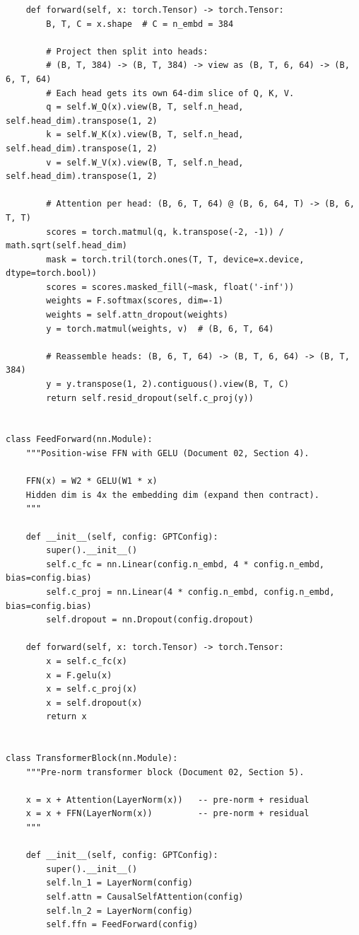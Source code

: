\begin{lstlisting}
    def forward(self, x: torch.Tensor) -> torch.Tensor:
        B, T, C = x.shape  # C = n_embd = 384

        # Project then split into heads:
        # (B, T, 384) -> (B, T, 384) -> view as (B, T, 6, 64) -> (B, 6, T, 64)
        # Each head gets its own 64-dim slice of Q, K, V.
        q = self.W_Q(x).view(B, T, self.n_head, self.head_dim).transpose(1, 2)
        k = self.W_K(x).view(B, T, self.n_head, self.head_dim).transpose(1, 2)
        v = self.W_V(x).view(B, T, self.n_head, self.head_dim).transpose(1, 2)

        # Attention per head: (B, 6, T, 64) @ (B, 6, 64, T) -> (B, 6, T, T)
        scores = torch.matmul(q, k.transpose(-2, -1)) / math.sqrt(self.head_dim)
        mask = torch.tril(torch.ones(T, T, device=x.device, dtype=torch.bool))
        scores = scores.masked_fill(~mask, float('-inf'))
        weights = F.softmax(scores, dim=-1)
        weights = self.attn_dropout(weights)
        y = torch.matmul(weights, v)  # (B, 6, T, 64)

        # Reassemble heads: (B, 6, T, 64) -> (B, T, 6, 64) -> (B, T, 384)
        y = y.transpose(1, 2).contiguous().view(B, T, C)
        return self.resid_dropout(self.c_proj(y))


class FeedForward(nn.Module):
    """Position-wise FFN with GELU (Document 02, Section 4).

    FFN(x) = W2 * GELU(W1 * x)
    Hidden dim is 4x the embedding dim (expand then contract).
    """

    def __init__(self, config: GPTConfig):
        super().__init__()
        self.c_fc = nn.Linear(config.n_embd, 4 * config.n_embd, bias=config.bias)
        self.c_proj = nn.Linear(4 * config.n_embd, config.n_embd, bias=config.bias)
        self.dropout = nn.Dropout(config.dropout)

    def forward(self, x: torch.Tensor) -> torch.Tensor:
        x = self.c_fc(x)
        x = F.gelu(x)
        x = self.c_proj(x)
        x = self.dropout(x)
        return x


class TransformerBlock(nn.Module):
    """Pre-norm transformer block (Document 02, Section 5).

    x = x + Attention(LayerNorm(x))   -- pre-norm + residual
    x = x + FFN(LayerNorm(x))         -- pre-norm + residual
    """

    def __init__(self, config: GPTConfig):
        super().__init__()
        self.ln_1 = LayerNorm(config)
        self.attn = CausalSelfAttention(config)
        self.ln_2 = LayerNorm(config)
        self.ffn = FeedForward(config)


\end{lstlisting}
